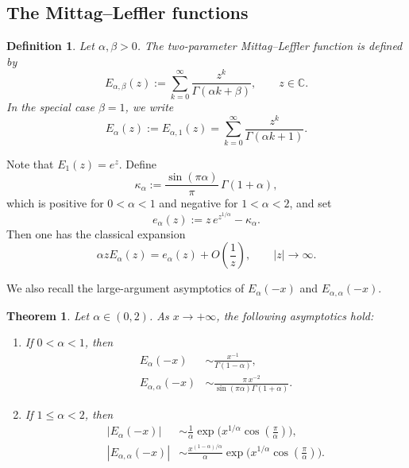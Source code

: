\documentclass[12pt, reqno]{amsart}
\newcommand{\C}{\ensuremath{\mathbb{C}}}
\newtheorem{definition}{Definition}[section]
\newtheorem{theorem}{Theorem}[section]
\begin{document}
\subsection{The Mittag--Leffler functions}
\begin{definition}
Let $\alpha,\beta>0$. The two-parameter Mittag--Leffler function is defined by
\begin{equation}\label{Mitag-two}
E_{\alpha,\beta}(z):=\sum_{k=0}^\infty \frac{z^k}{\Gamma(\alpha k+\beta)},
\qquad z\in\C.
\end{equation}
In the special case $\beta=1$, we write
\begin{equation}\label{Mitag}
E_\alpha(z):=E_{\alpha,1}(z)=\sum_{k=0}^\infty\frac{z^k}{\Gamma(\alpha k+1)}.
\end{equation}
\end{definition}
Note that $E_1(z)=e^z$. Define
\begin{equation}\label{c-alpha}
\kappa_\alpha:=\frac{\sin(\pi\alpha)}{\pi}\,\Gamma(1+\alpha),
\end{equation}
which is positive for $0<\alpha<1$ and negative for $1<\alpha<2$, and set
\begin{equation}\label{e-alpha}
e_\alpha(z):=z\,e^{z^{1/\alpha}}-\kappa_\alpha.
\end{equation}
Then one has the classical expansion
\begin{equation}\label{Asympt-E-alpha}
\alpha z E_\alpha(z)=e_\alpha(z)+O\!\left(\frac1z\right),\qquad |z|\to\infty.
\end{equation}

We also recall the large-argument asymptotics of $E_\alpha(-x)$ and $E_{\alpha,\alpha}(-x)$.
\begin{theorem}\label{thm:asympt-ML}
Let $\alpha\in(0,2)$. As $x\to+\infty$, the following asymptotics hold:
\begin{enumerate}
\item If $0<\alpha<1$, then
\begin{align}
E_\alpha(-x)&\sim \frac{x^{-1}}{\Gamma(1-\alpha)}, \label{E-alpha-1}\\
E_{\alpha,\alpha}(-x)&\sim \frac{\pi\,x^{-2}}{\sin(\pi\alpha)\Gamma(1+\alpha)}. \label{E-alpha-alpha-1}
\end{align}
\item If $1\le\alpha<2$, then
\begin{align}
|E_\alpha(-x)|
&\sim\frac1\alpha\exp\!\Big(x^{1/\alpha}\cos(\tfrac\pi\alpha)\Big), \label{E-alpha-2}\\
|E_{\alpha,\alpha}(-x)|
&\sim\frac{x^{(1-\alpha)/\alpha}}{\alpha}\exp\!\Big(x^{1/\alpha}\cos(\tfrac\pi\alpha)\Big). \label{E-alpha-alpha-2}
\end{align}
\end{enumerate}
\end{theorem}
\end{document}
